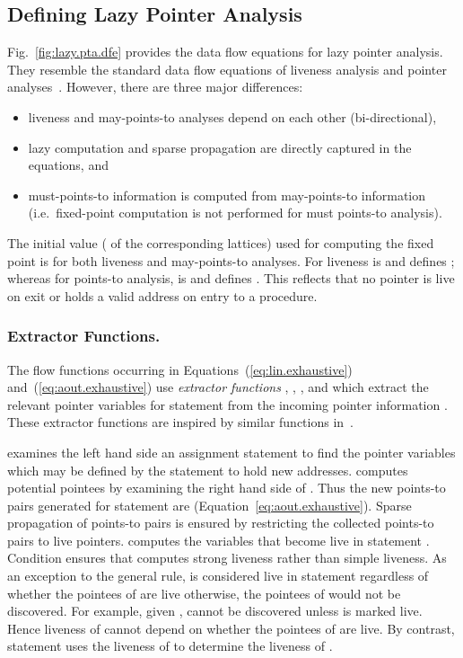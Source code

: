 \documentclass{llncs}
\newcommand{\boundary}{\text{\sf\em BI}\xspace}
\newcommand{\pt}[2]{\text{}}
\begin{document}
\subsection{Defining Lazy Pointer Analysis}
\label{sec:lazy.pta.formulation}



Fig.~\ref{fig:lazy.pta.dfe} provides the data flow equations for lazy
pointer analysis. They resemble the standard data flow equations of
liveness analysis and pointer
analyses~\cite{Khedker.U.Sanyal.A.Karkare.B:2009:Data-Flow-Analysis}.
However, there are three major differences: 
\begin{itemize}
\item liveness and may-points-to analyses depend on each other (bi-directional),
\item lazy computation and sparse propagation are directly captured in the
      equations, and
\item must-points-to information is computed from may-points-to
      information (i.e.\ fixed-point computation is not performed for must
      points-to analysis).
\end{itemize}
The initial value ( of the corresponding lattices)
used for computing the fixed point is 
for both liveness and may-points-to analyses.
For liveness \boundary is 
and defines ; whereas
for points-to analysis,
\boundary is \text{} and defines .
This reflects that no pointer is live on exit or holds a valid address
on entry to a procedure.




\subsubsection{Extractor Functions.}
The flow functions occurring in Equations~(\ref{eq:lin.exhaustive})
and~(\ref{eq:aout.exhaustive}) use {\em extractor functions\/} ,
, , and  which extract the relevant pointer
variables for statement  from the incoming pointer information
. These extractor functions are inspired by similar functions 
in~\cite{Emami.M.Ghiya.R.Hendren.LJ:1994:Context-sensitive-interprocedural-points-to,Kanade.A.Khedker.UP.Sanyal.A:2005:Heterogeneous-Fixed-Points}. 

 examines the left hand side an assignment statement to find
the pointer variables which may be defined by the statement to
hold new addresses.  computes potential pointees by
examining the right hand side of . Thus the new points-to pairs
generated for statement  are \text{}
(Equation~\ref{eq:aout.exhaustive}). Sparse propagation of points-to
pairs is ensured by restricting the collected points-to pairs to
live pointers.  computes the variables that become live in
statement . Condition \text{} ensures that
 computes strong liveness rather than simple liveness. As an
exception to the general rule,  is considered live in statement
\text{} regardless of whether the pointees of  are live
otherwise, the pointees of  would not be discovered. For example,
given , \pt{x}{a} cannot be
discovered unless  is marked live. Hence liveness of  cannot
depend on whether the pointees of  are live. By contrast, statement
\text{} uses the liveness of  to determine the liveness of .
\end{document}
